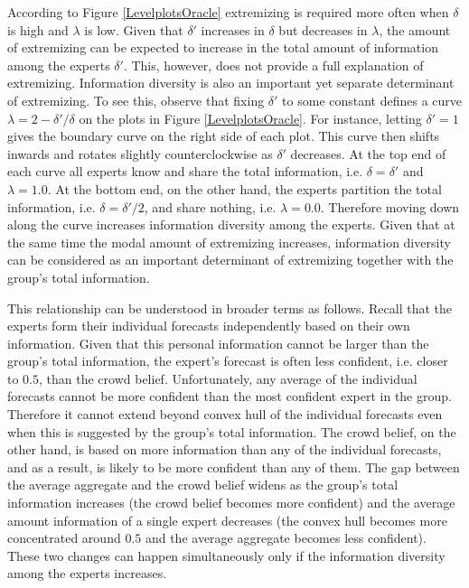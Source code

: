 \documentclass[11pt]{article}
\theoremstyle{definition}
\theoremstyle{definition}
\begin{document}
According to Figure \ref{LevelplotsOracle} extremizing is required more often when $\delta$ is high and $\lambda$ is low. Given that $\delta'$ increases in $\delta$ but decreases in $\lambda$, the amount of extremizing can be expected to increase in the total amount of information among the experts $\delta'$. This, however, does not provide a full explanation of extremizing. Information diversity is also an important yet separate determinant of extremizing. To see this, observe that fixing $\delta'$ to some constant defines a curve $\lambda = 2 - \delta'/\delta$ on the plots in Figure \ref{LevelplotsOracle}. For instance, letting $\delta' = 1$ gives the boundary curve on the right side of each plot. This curve then shifts inwards and rotates slightly counterclockwise as $\delta'$ decreases. At the top end of each curve all experts know and share the total information, i.e. $\delta = \delta'$ and $\lambda = 1.0$.  At the bottom end, on the other hand, the experts partition the total information, i.e. $\delta = \delta'/2$, and share nothing, i.e. $\lambda = 0.0$. Therefore moving down along the curve increases information diversity among the experts. Given that at the same time the modal amount of extremizing increases, information diversity can be considered as an important determinant of extremizing together with the group's total information. 

This relationship can be understood in broader terms as follows. Recall that the experts form their individual forecasts independently based on their own information. Given that this personal information cannot be larger than the group's total information, the expert's forecast is often less confident, i.e. closer to $0.5$, than the crowd belief. Unfortunately, any average of the individual forecasts cannot be more confident than the most confident expert in the group. Therefore it cannot extend beyond convex hull of the individual forecasts even when this is suggested by the group's total information. The crowd belief, on the other hand, is based on more information than any of the individual forecasts, and as a result, is likely to be more confident than any of them. The gap between the average aggregate and the crowd belief widens as the group's total information increases (the crowd belief becomes more confident) and the average amount information of a single expert decreases (the convex hull becomes more concentrated around $0.5$ and the average aggregate becomes less confident). These two changes can happen simultaneously only if the information diversity among the experts increases. 
\end{document}
